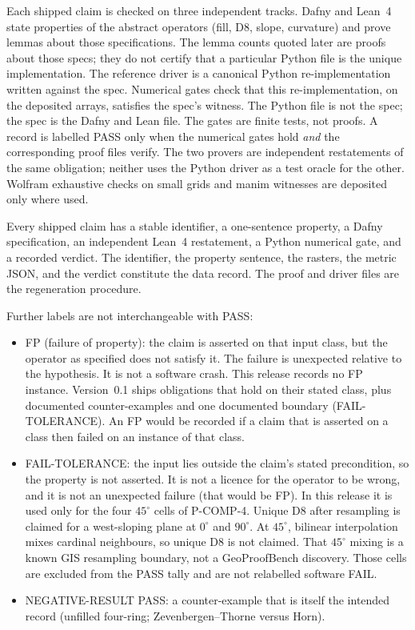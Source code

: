\documentclass[11pt,a4paper]{article}
\begin{document}
Each shipped claim is checked on three independent tracks. Dafny and
Lean~4 state properties of the abstract operators (fill, D8, slope,
curvature) and prove lemmas about those specifications. The lemma counts
quoted later are proofs about those specs; they do not certify that a
particular Python file is the unique implementation. The reference
driver is a canonical Python re-implementation written against the spec.
Numerical gates check that this re-implementation, on the deposited
arrays, satisfies the spec's witness. The Python file is not the spec;
the spec is the Dafny and Lean file. The gates are finite tests, not
proofs. A record is labelled
PASS only when the numerical gates hold \emph{and} the corresponding
proof files verify. The two provers are independent restatements of the
same obligation; neither uses the Python driver as a test oracle for the
other. Wolfram exhaustive checks on small grids and manim witnesses are
deposited only where used.

Every shipped claim has a stable identifier, a one-sentence property, a
Dafny specification, an independent Lean~4 restatement, a Python
numerical gate, and a recorded verdict. The identifier, the property
sentence, the rasters, the metric JSON, and the verdict constitute the
data record. The proof and driver files are the regeneration procedure.

Further labels are not interchangeable with PASS:

\begin{itemize}
\item FP (failure of property): the claim is asserted on that input
  class, but the operator as specified does not satisfy it. The failure
  is unexpected relative to the hypothesis. It is not a software crash.
  This release records no FP instance. Version~0.1 ships obligations
  that hold on their stated class, plus documented counter-examples and
  one documented boundary (FAIL-TOLERANCE). An FP would be recorded if a
  claim that is asserted on a class then failed on an instance of that
  class.
\item FAIL-TOLERANCE: the input lies outside the claim's stated
  precondition, so the property is not asserted. It is not a licence for
  the operator to be wrong, and it is not an unexpected failure (that
  would be FP). In this release it is used only for the four
  $45^{\circ}$ cells of P-COMP-4. Unique D8 after resampling is claimed
  for a west-sloping plane at $0^{\circ}$ and $90^{\circ}$. At
  $45^{\circ}$, bilinear interpolation mixes cardinal neighbours, so
  unique D8 is not claimed. That $45^{\circ}$ mixing is a known GIS
  resampling boundary, not a GeoProofBench discovery. Those cells are excluded from the PASS tally
  and are not relabelled software FAIL.
\item NEGATIVE-RESULT PASS: a counter-example that is itself the
  intended record (unfilled four-ring; Zevenbergen--Thorne versus Horn).
\end{itemize}
\end{document}
